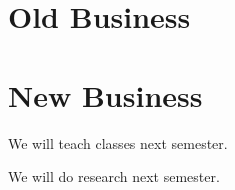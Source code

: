 \documentclass[11pt]{meetingmins}
\begin{document}
\section{Old Business}
\begin{items}
\item
\priormins
\end{items}

\section{New Business}
\begin{items}
\item
We will teach classes next semester.
\item
We will do research next semester. 
\end{items}

\vspace{1em}

\end{document}
